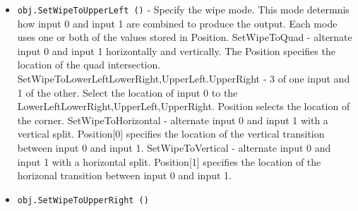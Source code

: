 \begin{itemize}
\item  \verb|obj.SetWipeToUpperLeft ()| -  Specify the wipe mode. This mode determnis how input 0 and input
 1 are combined to produce the output. Each mode uses one or both
 of the values stored in Position.
   SetWipeToQuad - alternate input 0 and input 1 horizontally and
     vertically. The Position specifies the location of the quad
     intersection.
   SetWipeToLowerLeft{LowerRight,UpperLeft.UpperRight} - 3 of one
     input and 1 of the other. Select the location of input 0 to the
     LowerLeft{LowerRight,UpperLeft,UpperRight}. Position
     selects the location of the corner.
   SetWipeToHorizontal - alternate input 0 and input 1 with a vertical
     split. Position[0] specifies the location of the vertical
     transition between input 0 and input 1.
   SetWipeToVertical - alternate input 0 and input 1 with a
     horizontal split. Position[1] specifies the location of the
     horizonal transition between input 0 and input 1.

\item  \verb|obj.SetWipeToUpperRight ()|

\end{itemize}
